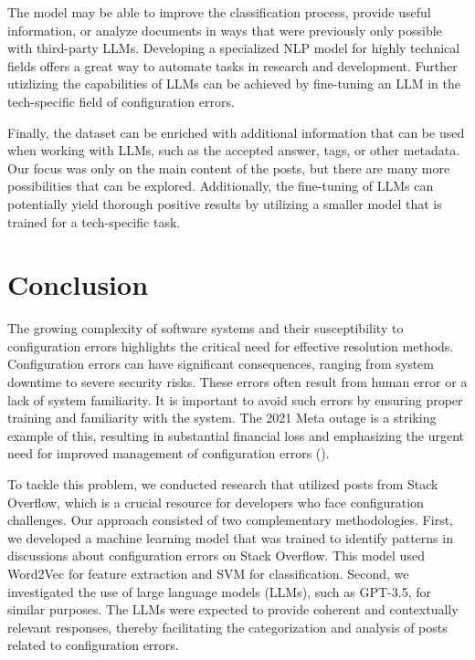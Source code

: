 \documentclass[english,bachelor]{swsLeipzig}
\begin{document}
The model may be able to improve the classification process, provide useful information, or analyze documents in ways that were previously only possible with third-party LLMs. Developing a specialized NLP model for highly technical fields offers a great way to automate tasks in research and development. Further utizlizing the capabilities of LLMs can be achieved by fine-tuning an LLM in the tech-specific field of configuration errors.

Finally, the dataset can be enriched with additional information that can be used when working with LLMs, such as the accepted answer, tags, or other metadata. Our focus was only on the main content of the posts, but there are many more possibilities that can be explored. Additionally, the fine-tuning of LLMs can potentially yield thorough positive results by utilizing a smaller model that is trained for a tech-specific task.

\chapter{Conclusion}

The growing complexity of software systems and their susceptibility to configuration errors highlights the critical need for effective resolution methods. Configuration errors can have significant consequences, ranging from system downtime to severe security risks. These errors often result from human error or a lack of system familiarity. It is important to avoid such errors by ensuring proper training and familiarity with the system. The 2021 Meta outage is a striking example of this, resulting in substantial financial loss and emphasizing the urgent need for improved management of configuration errors (\citet{guardian:2021}).

To tackle this problem, we conducted research that utilized posts from Stack Overflow, which is a crucial resource for developers who face configuration challenges. Our approach consisted of two complementary methodologies. First, we developed a machine learning model that was trained to identify patterns in discussions about configuration errors on Stack Overflow. This model used Word2Vec for feature extraction and SVM for classification. Second, we investigated the use of large language models (LLMs), such as GPT-3.5, for similar purposes. The LLMs were expected to provide coherent and contextually relevant responses, thereby facilitating the categorization and analysis of posts related to configuration errors.
\end{document}
